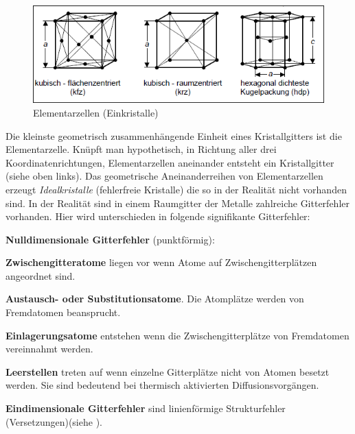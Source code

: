 \documentclass[12pt,a4paper,parskip,twoside,BCOR5mm,headsepline]{scrartcl}
\begin{document}
\begin{description*}
{\begin{itemize*}
\end{itemize*}
\begin{figure}
\centering
\includegraphics[width=.8\textwidth]{elementarzellen}
\caption[Elementarzellen]{Elementarzellen (Einkristalle) \autocite[37]{hu}}
\label{fig:elementarzellen}
\end{figure}





Die kleinste geometrisch zusammenhängende Einheit eines Kristallgitters ist die Elementarzelle. Knüpft man hypothetisch, in Richtung aller drei Koordinatenrichtungen, Elementarzellen aneinander entsteht ein Kristallgitter (siehe  oben links). Das geometrische Aneinanderreihen von Elementarzellen erzeugt \emph{Idealkristalle} (fehlerfreie Kristalle) die so in der Realität nicht vorhanden sind. In der Realität sind in einem Raumgitter der Metalle zahlreiche Gitterfehler vorhanden. Hier wird unterschieden in folgende signifikante Gitterfehler:
\begin{enumerate*}
\item  \textbf{Nulldimensionale Gitterfehler} (punktförmig):
\begin{itemize*}
\item \textbf{Zwischengitteratome} liegen vor wenn Atome auf Zwischengitterplätzen angeordnet sind. 
\item \textbf{Austausch- oder Substitutionsatome}. Die Atomplätze werden von Fremdatomen beansprucht.
\item \textbf{Einlagerungsatome} entstehen wenn die Zwischengitterplätze von Fremdatomen vereinnahmt werden.
\item \textbf{Leerstellen} treten auf  wenn einzelne Gitterplätze nicht von Atomen besetzt werden. Sie sind bedeutend bei thermisch aktivierten Diffusionsvorgängen.
\end{itemize*}
\item \textbf{Eindimensionale Gitterfehler} sind linienförmige Strukturfehler (Versetzungen)(siehe ).


\end{enumerate*}}
\end{description*}
\end{document}
